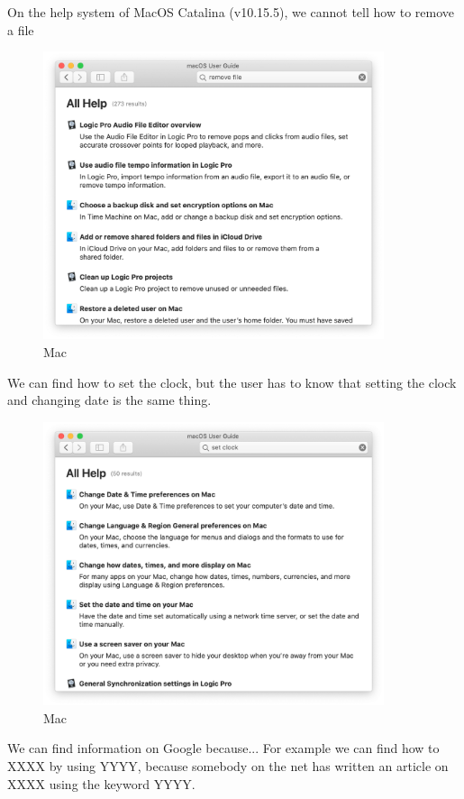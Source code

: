 \documentclass[manuscript,screen,review]{acmart}
\begin{document}
On the help system of MacOS Catalina (v10.15.5), we cannot tell how to remove a file

\begin{figure}[H]
  \centering
  \includegraphics[width=10cm,bb=0 0 1290 1090]{figures/eaa80e41ddc3d3620fae133007274573.png}
  \caption{Mac}
\end{figure}

We can find how to set the clock, but the user has to know that
setting the clock and changing date is the same thing.

\begin{figure}[H]
  \centering
  \includegraphics[width=10cm,bb=0 0 1310 1090]{figures/0cd679128d8f69eb2a8a966d6466a8a4.png}
  \caption{Mac}
\end{figure}

We can find information on Google because...
For example we can find how to XXXX by using YYYY, because somebody on the net has written an article on XXXX using the keyword YYYY.
\end{document}
